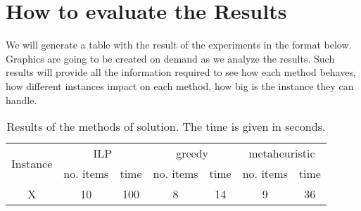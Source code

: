 \section{How to evaluate the Results}

We will generate a table with the result of the experiments in the format below. Graphics are going to be created on demand as we analyze the results. Such results will provide all the information required to see how each method behaves, how different instances impact on each method, how big is the instance they can handle.

\begin{table}[ht!]
    \centering
    \begin{tabular}{|c|c|c|c|c|c|c|}
        \hline
        \multirow{2}{*}{Instance} &
            \multicolumn{2}{c|}{ILP} &
            \multicolumn{2}{c|}{greedy} &
            \multicolumn{2}{c|}{metaheuristic} \\
            & no. items & time & no. items & time & no. items & time\\
        \hline\hline
        X & 10 & 100 & 8 & 14 & 9 & 36 \\
        \hline
    \end{tabular}
    \caption{Results of the methods of solution. The time is given in seconds.}
\end{table}
